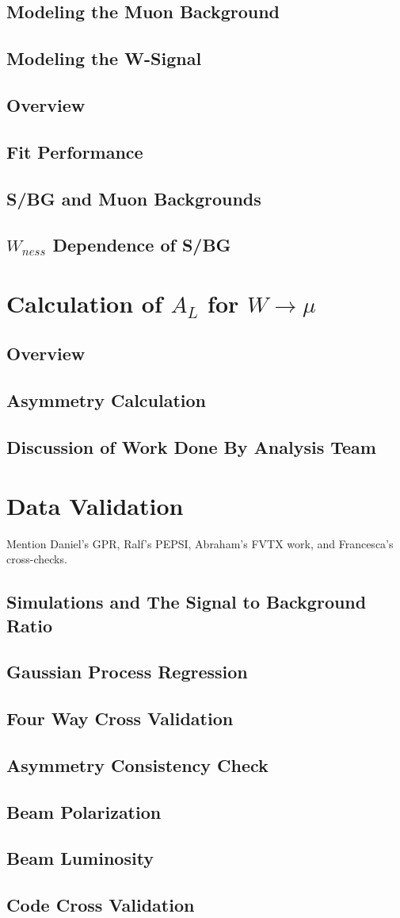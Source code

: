 \subsection{Modeling the Muon Background}
\subsection{Modeling the W-Signal}
\subsection{Overview}
\subsection{Fit Performance}
\subsection{S/BG and Muon Backgrounds}
\label{sec:sbr}
\subsection{$W_{ness}$ Dependence of S/BG}
\section{Calculation of $A_{L}$ for $W\rightarrow\mu$}
\subsection{Overview}
\subsection{Asymmetry Calculation}
\subsection{Discussion of Work Done By Analysis Team}
\section{Data Validation}
Mention Daniel's GPR, Ralf's PEPSI, Abraham's FVTX work, and Francesca's cross-checks.
\subsection{Simulations and The Signal to Background Ratio}
\subsection{Gaussian Process Regression}
\subsection{Four Way Cross Validation}
\subsection{Asymmetry Consistency Check}
\subsection{Beam Polarization}
\subsection{Beam Luminosity}
\subsection{Code Cross Validation}
